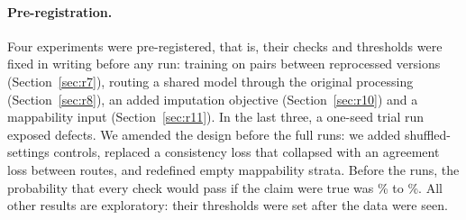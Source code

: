 \documentclass[pdflatex,sn-mathphys-num]{sn-jnl}
\begin{document}
\paragraph{Pre-registration.} Four experiments were pre-registered, that is, their checks and
thresholds were fixed in writing before any run: training on pairs between reprocessed
versions (Section~\ref{sec:r7}), routing a shared model through the original processing
(Section~\ref{sec:r8}), an added imputation objective (Section~\ref{sec:r10}) and a
mappability input (Section~\ref{sec:r11}). In the last three, a one-seed trial run exposed
defects. We amended the design before the full runs: we added shuffled-settings controls,
replaced a consistency loss that collapsed with an agreement loss between routes, and
redefined empty mappability strata. Before the runs, the probability that every check would
pass if the claim were true was \powJoint\% to \powPivot\%. All other results are
exploratory: their thresholds were set after the data were seen.
\end{document}
